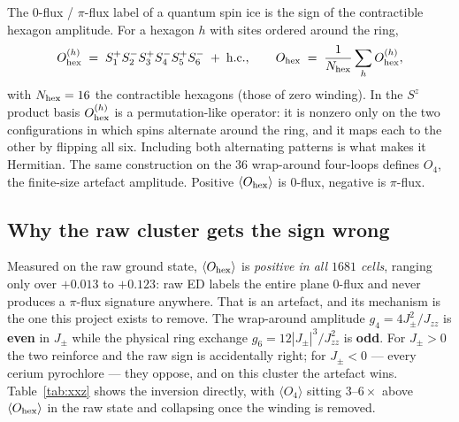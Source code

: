 \documentclass[11pt]{article}
\newcommand{\Jzz}{J_{zz}}
\newcommand{\Jpm}{J_{\pm}}
\newcommand{\gsix}{g_6}
\newcommand{\gfour}{g_4}
\newcommand{\Ohex}{O_{\rm hex}}
\newcommand{\Ofour}{O_{4}}
\begin{document}
The $0$-flux / $\pi$-flux label of a quantum spin ice is the sign of the
contractible hexagon amplitude.  For a hexagon $h$ with sites ordered
around the ring,
\begin{equation}
\Ohex^{(h)} \;=\; S^+_1S^-_2S^+_3S^-_4S^+_5S^-_6 \;+\; {\rm h.c.},
\qquad
\Ohex \;=\; \frac{1}{N_{\rm hex}}\sum_{h}\Ohex^{(h)},
\label{eq:ohex}
\end{equation}
with $N_{\rm hex}=16$ the contractible hexagons (those of zero winding).  In
the $S^z$ product basis $\Ohex^{(h)}$ is a permutation-like operator: it is
nonzero only on the two configurations in which spins alternate around the
ring, and it maps each to the other by flipping all six.  Including both
alternating patterns is what makes it Hermitian.  The same construction on
the $36$ wrap-around four-loops defines $\Ofour$, the finite-size artefact
amplitude.  Positive $\langle\Ohex\rangle$ is $0$-flux, negative is
$\pi$-flux.

\subsection{Why the raw cluster gets the sign wrong}

Measured on the raw ground state, $\langle\Ohex\rangle$ is
\emph{positive in all $1681$ cells}, ranging only over
$+0.013$ to $+0.123$: raw ED labels the entire plane $0$-flux and never
produces a $\pi$-flux signature anywhere.  That is an artefact, and its
mechanism is the one this project exists to remove.  The wrap-around
amplitude $\gfour=4\Jpm^2/\Jzz$ is \textbf{even} in $\Jpm$ while the
physical ring exchange $\gsix=12|\Jpm|^3/\Jzz^2$ is \textbf{odd}.  For
$\Jpm>0$ the two reinforce and the raw sign is accidentally right; for
$\Jpm<0$ --- every cerium pyrochlore --- they oppose, and on this cluster
the artefact wins.  Table~\ref{tab:xxz} shows the inversion directly, with
$\langle\Ofour\rangle$ sitting $3$--$6\times$ above $\langle\Ohex\rangle$
in the raw state and collapsing once the winding is removed.
\end{document}
